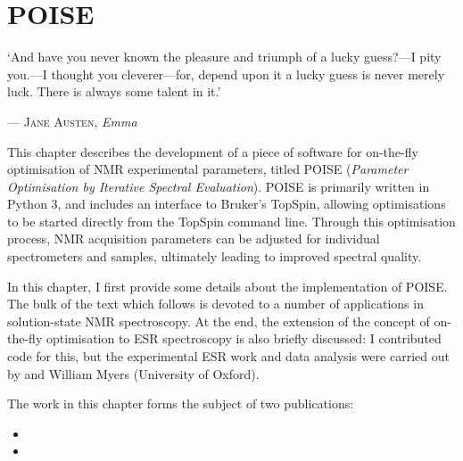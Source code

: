 \chapter{POISE}
\label{chpt:poise}

\epigraph{\singlespacing%
`And have you never known the pleasure and triumph of a lucky guess?---I pity you.---I thought you cleverer---for, depend upon it a lucky guess is never merely luck. There is always some talent in it.'%
}{--- \textsc{Jane Austen}, \textit{Emma}}

This chapter describes the development of a piece of software for on-the-fly optimisation of NMR experimental parameters, titled POISE (\textit{Parameter Optimisation by Iterative Spectral Evaluation}).
POISE is primarily written in Python 3, and includes an interface to Bruker's TopSpin, allowing optimisations to be started directly from the TopSpin command line.
Through this optimisation process, NMR acquisition parameters can be adjusted for individual spectrometers and samples, ultimately leading to improved spectral quality.

In this chapter, I first provide some details about the implementation of POISE.
The bulk of the text which follows is devoted to a number of applications in solution-state NMR spectroscopy.
At the end, the extension of the concept of on-the-fly optimisation to ESR spectroscopy is also briefly discussed: I contributed code for this, but the experimental ESR work and data analysis were carried out by \JBV{} and William Myers (University of Oxford).

The work in this chapter forms the subject of two publications:

\begin{itemize}
    \item {}
    \item {}
\end{itemize}

\clearpage







\printbibliography[heading=subbibnumbered]{}
